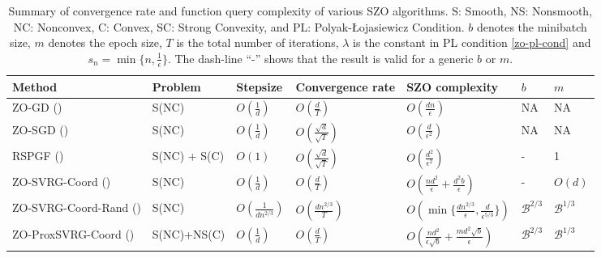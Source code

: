 \documentclass[iicol,sn-basic]{sn-jnl}
\theoremstyle{thmstyleone}%
\theoremstyle{thmstyletwo}%
\theoremstyle{thmstylethree}%
\begin{document}
\begin{table}[htb!]
 \centering
\caption{Summary of convergence rate and function query complexity of various SZO algorithms. S: Smooth, NS: Nonsmooth, NC: Nonconvex, C: Convex, SC: Strong Convexity, and PL: Polyak-Łojasiewicz Condition. $b$ denotes the minibatch size, $m$ denotes the epoch size, $T$ is the total number of iterations, $\lambda$ is the constant in PL condition \eqref{zo-pl-cond} and $s_n = \min\{n, \frac{1}{\epsilon}\}$. The dash-line ``-'' shows that the result is valid for a generic $b$ or $m$.}
\label{table-compare}
\begin{adjustbox}{width=1.\linewidth,center}
{
\begin{tabular}{ |l|l|l|l|l|l|l| } 
 \hline
 Method & Problem & Stepsize& Convergence rate & SZO complexity & $b$ & $m$\\ 
 \hline
 ZO-GD (\cite{nesterov2011random}) & S(NC) & $O\left(\frac{1}{d}\right)$ & $O\left(\frac{d}{T}\right)$ &$O\left(\frac{dn}{\epsilon}\right)$ & NA & NA \\
 ZO-SGD (\cite{ghadimi2013stochastic}) & S(NC) & $O\left(\frac{1}{d}\right)$ & $O\left(\frac{\sqrt{d}}{\sqrt{T}}\right)$ &$O\left(\frac{d}{\epsilon^2}\right)$ & NA & NA\\ 
 RSPGF (\cite{ghadimi2016mini}) & S(NC) + S(C) & $O\left(1\right)$ & $O\left(\frac{\sqrt{d}}{\sqrt{T}}\right)$ &$O\left(\frac{d^2}{\epsilon^2}\right)$ & - & 1\\
 ZO-SVRG-Coord (\cite{liu2018zeroth}) & S(NC)& $O\left(\frac{1}{{d}}\right)$ & $O\left(\frac{d}{T}\right)$ & $O(\frac{nd^2}{\epsilon}+\frac{d^2b}{\epsilon})$ & - & $O(d)$ \\
 ZO-SVRG-Coord-Rand (\cite{ji2019improved}) & S(NC) & $O\left(\frac{1}{{dn^{2/3}}}\right)$ & $O\left(\frac{dn^{2/3}}{T}\right)$ & $O(\min\{\frac{dn^{2/3}}{\epsilon},\frac{d}{\epsilon^{5/3}}\})$ & $\mathcal{B}^{2/3}$ & $\mathcal{B}^{1/3}$ \\
  ZO-ProxSVRG-Coord (\cite{huang2019faster}) & S(NC)+NS(C) & $O\left(\frac{1}{{d}}\right)$ & $O\left(\frac{d}{T}\right)$ &  $O(\frac{nd^2}{\epsilon\sqrt{b}}+\frac{md^2\sqrt{b}}{\epsilon})$ & $\mathcal{B}^{2/3}$ & $\mathcal{B}^{1/3}$\\

\end{tabular}}
\end{adjustbox}
\end{table}
\end{document}
